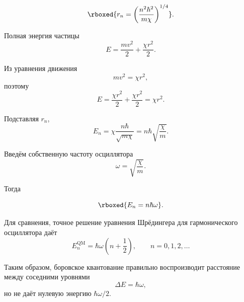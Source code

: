 \documentclass[../final.tex]{subfiles}
\begin{document}
\[
    \rboxed{
        r_n
        =
        \left(
            \frac{n^2\hbar^2}{m\chi}
        \right)^{1/4}
    }.
\]



Полная энергия частицы
%
\begin{equation*}
    E
    =
    \frac{mv^2}{2}
    +
    \frac{\chi r^2}{2}.
\end{equation*}

Из уравнения движения
%
\begin{equation*}
    mv^2
    =
    \chi r^2,
\end{equation*}
%
поэтому
%
\begin{equation*}
    E
    =
    \frac{\chi r^2}{2}
    +
    \frac{\chi r^2}{2}
    =
    \chi r^2.
\end{equation*}

Подставляя $r_n$,
%
\begin{equation*}
    E_n
    =
    \chi
    \frac{n\hbar}{\sqrt{m\chi}}
    =
    n\hbar
    \sqrt{\frac{\chi}{m}}.
\end{equation*}

Введём собственную частоту осциллятора
%
\begin{equation*}
    \omega
    =
    \sqrt{\frac{\chi}{m}}.
\end{equation*}

Тогда

\[
    \rboxed{
        E_n
        =
        n\hbar\omega
    }.
\]

Для сравнения, точное решение уравнения Шрёдингера для гармонического
осциллятора даёт
%
\begin{equation*}
    E_n^{\text{QM}}
    =
    \hbar\omega
    \left(
        n+\frac12
    \right),
    \qquad
    n=0,1,2,\ldots
\end{equation*}

Таким образом, боровское квантование правильно воспроизводит
расстояние между соседними уровнями
%
\begin{equation*}
    \Delta E
    =
    \hbar\omega,
\end{equation*}
%
но не даёт нулевую энергию $\hbar\omega/2$.



\end{document}
